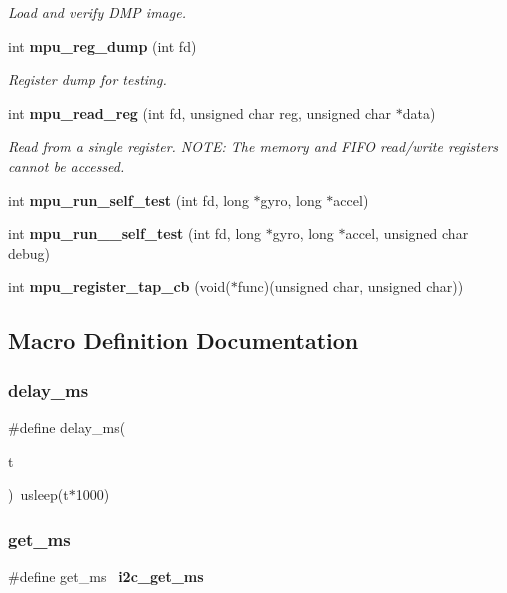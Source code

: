 \begin{DoxyCompactItemize}
\begin{DoxyCompactList}\small\item\em Load and verify D\+MP image. \end{DoxyCompactList}\item 
int \textbf{ mpu\+\_\+reg\+\_\+dump} (int fd)
\begin{DoxyCompactList}\small\item\em Register dump for testing. \end{DoxyCompactList}\item 
int \textbf{ mpu\+\_\+read\+\_\+reg} (int fd, unsigned char reg, unsigned char $\ast$data)
\begin{DoxyCompactList}\small\item\em Read from a single register. N\+O\+TE\+: The memory and F\+I\+FO read/write registers cannot be accessed. \end{DoxyCompactList}\item 
int \textbf{ mpu\+\_\+run\+\_\+self\+\_\+test} (int fd, long $\ast$gyro, long $\ast$accel)
\item 
int \textbf{ mpu\+\_\+run\+\_\+\_\+self\+\_\+test} (int fd, long $\ast$gyro, long $\ast$accel, unsigned char debug)
\item 
int \textbf{ mpu\+\_\+register\+\_\+tap\+\_\+cb} (void($\ast$func)(unsigned char, unsigned char))
\end{DoxyCompactItemize}


\subsection{Macro Definition Documentation}
\mbox{\label{mpu_8h_a7cc5adf4e7dc9af23d6349c0a8dd2fa1}} 
\subsubsection{delay\+\_\+ms}
{\footnotesize\ttfamily \#define delay\+\_\+ms(\begin{DoxyParamCaption}\item[{}]{t }\end{DoxyParamCaption})~usleep(t$\ast$1000)}

\mbox{\label{mpu_8h_a3e6b6bc6d1cd2956353a31bfadd3c332}} 
\subsubsection{get\+\_\+ms}
{\footnotesize\ttfamily \#define get\+\_\+ms~\textbf{ i2c\+\_\+get\+\_\+ms}}

